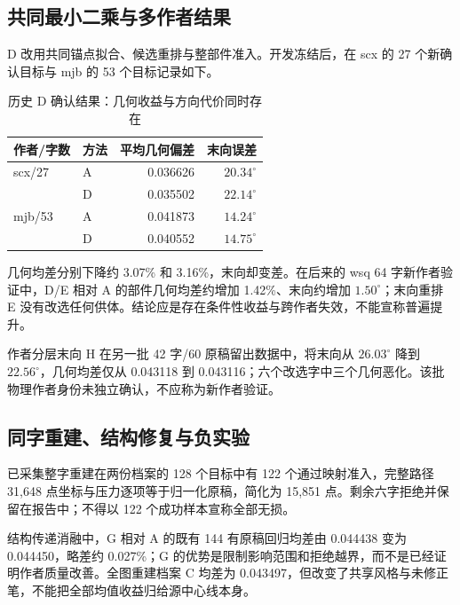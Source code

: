 \documentclass[UTF8,a4paper,11pt,fontset=fandol]{ctexart}
\begin{document}
\subsection{共同最小二乘与多作者结果}
D 改用共同锚点拟合、候选重排与整部件准入。开发冻结后，在 scx 的 27 个新确认目标与 mjb 的 53 个目标记录如下\cite{context-note}。
\begin{table}[H]\centering\small
\caption{历史 D 确认结果：几何收益与方向代价同时存在}
\begin{tabular}{llrr}\toprule
作者/字数 & 方法 & 平均几何偏差 & 末向误差\\\midrule
scx/27 & A & 0.036626 & $20.34^\circ$\\
 & D & 0.035502 & $22.14^\circ$\\
mjb/53 & A & 0.041873 & $14.24^\circ$\\
 & D & 0.040552 & $14.75^\circ$\\\bottomrule
\end{tabular}
\end{table}
几何均差分别下降约 3.07\% 和 3.16\%，末向却变差。在后来的 wsq 64 字新作者验证中，D/E 相对 A 的部件几何均差约增加 1.42\%、末向约增加 $1.50^\circ$；末向重排 E 没有改选任何供体。结论应是存在条件性收益与跨作者失效，不能宣称普遍提升。

作者分层末向 H 在另一批 42 字/60 原稿留出数据中，将末向从 $26.03^\circ$ 降到 $22.56^\circ$，几何均差仅从 0.043118 到 0.043116；六个改选字中三个几何恶化。该批物理作者身份未独立确认，不应称为新作者验证\cite{terminal-note}。

\subsection{同字重建、结构修复与负实验}
已采集整字重建在两份档案的 128 个目标中有 122 个通过映射准入，完整路径 31,648 点坐标与压力逐项等于归一化原稿，简化为 15,851 点。剩余六字拒绝并保留在报告中；不得以 122 个成功样本宣称全部无损\cite{observed-note}。

结构传递消融中，G 相对 A 的既有 144 有原稿回归均差由 0.044438 变为 0.044450，略差约 0.027\%；G 的优势是限制影响范围和拒绝越界，而不是已经证明作者质量改善。全图重建档案 C 均差为 0.043497，但改变了共享风格与未修正笔，不能把全部均值收益归给源中心线本身\cite{delta-note}。
\end{document}
